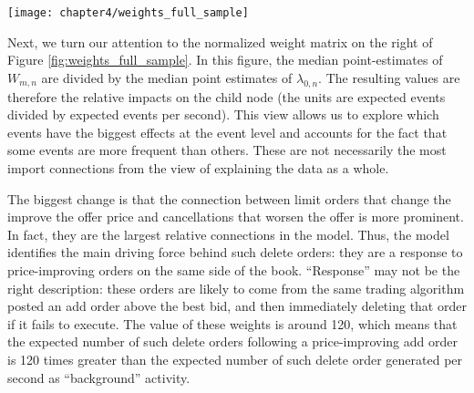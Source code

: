 		\begin{sidewaysfigure}[p]
			\small
			\linespread{1}
			\centering
			\texttt{[image: chapter4/weights\_full\_sample]}
			\captionsetup{position=below, font=footnotesize, justification=justified, width=\linewidth, skip=-20pt}
			\caption[Median of event connection point-estimates: full sample]{Median of event connection point-estimates: full sample. The figure shows the median connection strength between event types across the full sample of stocks. Larger values indicate stronger connections, which are expected to generate a greater number of child events. (Left) The median of connection weight estimates using the raw weight matrix estimates. This figure identifies the most important connections in an absolute sense. (Right) The median connection weight matrix after normalizing parent-child weights by the estimated background rate of child events. This figure identifies the most important connections in a relative sense.}
			\label{fig:weights_full_sample}
		\end{sidewaysfigure}

		Next, we turn our attention to the normalized weight matrix on the right of Figure \ref{fig:weights_full_sample}. In this figure, the median point-estimates of $W_{m,n}$ are divided by the median point estimates of $\lambda_{0,n}$. The resulting values are therefore the relative impacts on the child node (the units are expected events divided by expected events per second). This view allows us to explore which events have the biggest effects at the event level and accounts for the fact that some events are more frequent than others. These are not necessarily the most import connections from the view of explaining the data as a whole.

		The biggest change is that the connection between limit orders that change the improve the offer price and cancellations that worsen the offer is more prominent. In fact, they are the largest relative connections in the model. Thus, the model identifies the main driving force behind such delete orders: they are a response to price-improving orders on the same side of the book. “Response” may not be the right description: these orders are likely to come from the same trading algorithm posted an add order above the best bid, and then immediately deleting that order if it fails to execute. The value of these weights is around 120, which means that the expected number of such delete orders following a price-improving add order is 120 times greater than the expected number of such delete order generated per second as “background” activity.

